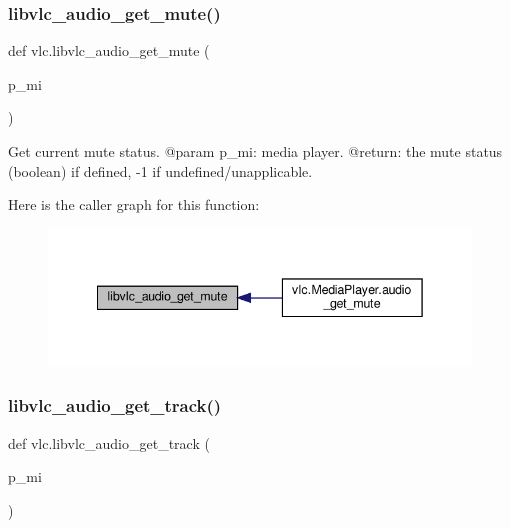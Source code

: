 \subsubsection{\texorpdfstring{libvlc\+\_\+audio\+\_\+get\+\_\+mute()}{libvlc\_audio\_get\_mute()}}
{\footnotesize\ttfamily def vlc.\+libvlc\+\_\+audio\+\_\+get\+\_\+mute (\begin{DoxyParamCaption}\item[{}]{p\+\_\+mi }\end{DoxyParamCaption})}

\begin{DoxyVerb}Get current mute status.
@param p_mi: media player.
@return: the mute status (boolean) if defined, -1 if undefined/unapplicable.
\end{DoxyVerb}
 Here is the caller graph for this function\+:
\nopagebreak
\begin{figure}[H]
\begin{center}
\leavevmode
\includegraphics[width=342pt]{namespacevlc_a4cdfbd29f8712d56aed3fa83b76a1b56_icgraph}
\end{center}
\end{figure}
\mbox{\label{namespacevlc_aacb5cb891887883b6969a152656bfb75}} 
\subsubsection{\texorpdfstring{libvlc\+\_\+audio\+\_\+get\+\_\+track()}{libvlc\_audio\_get\_track()}}
{\footnotesize\ttfamily def vlc.\+libvlc\+\_\+audio\+\_\+get\+\_\+track (\begin{DoxyParamCaption}\item[{}]{p\+\_\+mi }\end{DoxyParamCaption})}

